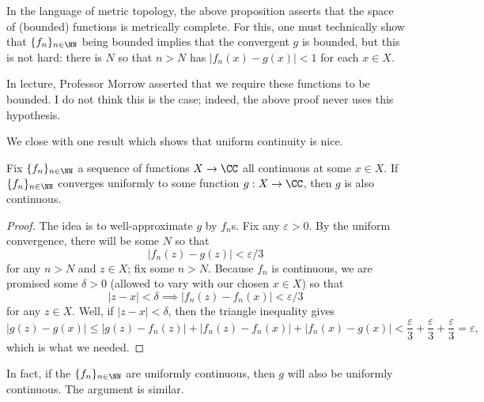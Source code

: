 \begin{remark}[Nir]
	In the language of metric topology, the above proposition asserts that the space of (bounded) functions is metrically complete. For this, one must technically show that $\{f_n\}_{n\in\NN}$ being bounded implies that the convergent $g$ is bounded, but this is not hard: there is $N$ so that $n>N$ has $|f_n(x)-g(x)|<1$ for each $x\in X$.
\end{remark}
\begin{remark}
	In lecture, Professor Morrow asserted that we require these functions to be bounded. I do not think this is the case; indeed, the above proof never uses this hypothesis.
\end{remark}
We close with one result which shows that uniform continuity is nice.
\begin{proposition} \label{prop:uniformgoodcontinuity}
	Fix $\{f_n\}_{n\in\NN}$ a sequence of functions $X\to\CC$ all continuous at some $x\in X$. If $\{f_n\}_{n\in\NN}$ converges uniformly to some function $g:X\to\CC$, then $g$ is also continuous.
\end{proposition}
\begin{proof}
	The idea is to well-approximate $g$ by $f_n$s. Fix any $\varepsilon>0$. By the uniform convergence, there will be some $N$ so that
	\[|f_n(z)-g(z)|<\varepsilon/3\]
	for any $n>N$ and $z\in X$; fix some $n>N$. Because $f_n$ is continuous, we are promised some $\delta>0$ (allowed to vary with our chosen $x\in X$) so that
	\[|z-x|<\delta\implies|f_n(z)-f_n(x)|<\varepsilon/3\]
	for any $z\in X$. Well, if $|z-x|<\delta$, then the triangle inequality gives
	\[|g(z)-g(x)|\le|g(z)-f_n(z)|+|f_n(z)-f_n(x)|+|f_n(x)-g(x)|<\frac\varepsilon3+\frac\varepsilon3+\frac\varepsilon3=\varepsilon,\]
	which is what we needed.
\end{proof}
\begin{remark}[Nir]
	In fact, if the $\{f_n\}_{n\in\NN}$ are uniformly continuous, then $g$ will also be uniformly continuous. The argument is similar.
\end{remark}